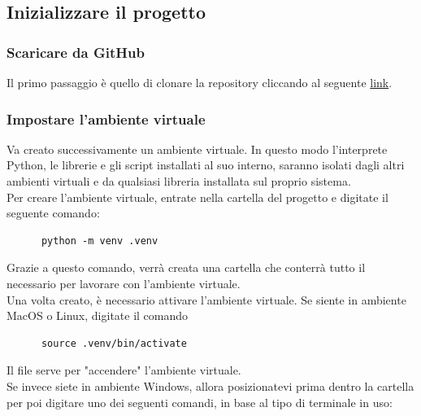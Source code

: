 \documentclass[12pt, letterpaper]{article}
\begin{document}
\subsection{Inizializzare il progetto}

\subsubsection{Scaricare da GitHub}

Il primo passaggio è quello di clonare la repository cliccando al seguente
\href{https://github.com/Stefano-Labianca/smart-energy-controller}{link}. \\

\subsubsection{Impostare l'ambiente virtuale}

\noindent Va creato successivamente un ambiente virtuale. In questo modo l'interprete Python,
le librerie e gli script installati al suo interno, saranno isolati dagli altri ambienti
virtuali e da qualsiasi libreria installata sul proprio sistema. \\

\noindent Per creare l'ambiente virtuale, entrate nella cartella del progetto e
digitate il seguente comando:

\begin{verbatim}
      python -m venv .venv
\end{verbatim}


\noindent Grazie a questo comando, verrà creata una cartella  che conterrà tutto il
necessario per lavorare con l'ambiente virtuale. \\

\noindent Una volta creato, è necessario attivare l'ambiente virtuale.
Se siente in ambiente MacOS o Linux, digitate il comando

\begin{verbatim}
      source .venv/bin/activate
\end{verbatim}

\noindent Il file  serve per "accendere" l'ambiente virtuale. \\

\noindent Se invece siete in ambiente Windows, allora posizionatevi prima dentro la cartella
 per poi  digitare uno dei seguenti comandi, in base al tipo di terminale in uso:
\end{document}
